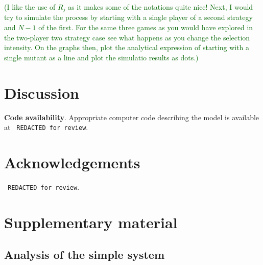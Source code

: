 \documentclass{article}
\newcommand{\cha}[1]{\textcolor{darkgreen}{(#1)}}
\begin{document}
\cha{I like the use of $R_j$ as it makes some of the notations quite nice! Next, I would try to simulate the process by starting with a single player of a second strategy and $N-1$ of the first. For the same three games as you would have explored in the two-player two strategy case see what happens as you change the selection intensity. On the graphs then, plot the analytical expression of starting with a single mutant as a line and plot the simulatio results as dots.}





\section{Discussion}


\textbf{Code availability}.
Appropriate computer code describing the model is available at 
\texttt{ REDACTED for review}.%

\section{Acknowledgements}
\texttt{ REDACTED for review}.%





\renewcommand{\theequation}{SI.\arabic{equation}}
\setcounter{equation}{0}

\renewcommand{\thefigure}{SI.\arabic{figure}}
\setcounter{figure}{0}

\section{Supplementary material}


\subsection{Analysis of the simple system}
\end{document}
